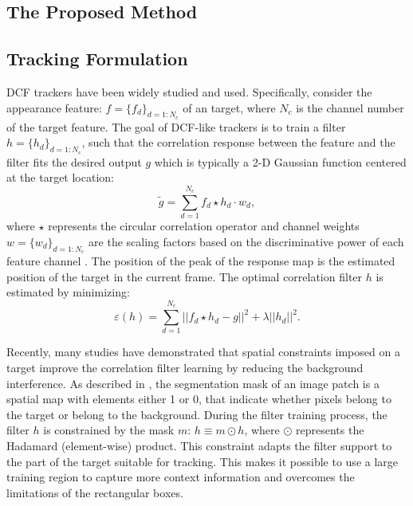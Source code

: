\documentclass[review]{elsarticle}
\begin{document}
\begin{CJK*}{UTF8}{gbsn}
\section{The Proposed Method}

\subsection{Tracking Formulation} \label{sec:InstMask}
DCF trackers \cite{Bolme2010VisualOT, Danelljan2014AccurateSE, Henriques2015HighSpeedTW, Li2014ASA} have been widely studied and used. Specifically, consider the appearance feature: $f=\{f_d\}_{d=1:N_c}$ of an target, where $N_c$ is the channel number of the target feature. The goal of DCF-like trackers is to train a filter $h=\{h_d\}_{d=1:N_c}$, such that the correlation response between the feature and the filter fits the desired output $g$ which is typically a 2-D Gaussian function centered at the target location: 
\begin{equation} \label{eq:dcf}
\tilde{g}=\sum_{d=1}^{N_c}f_d \star h_d \cdot w_d,
\end{equation}
where $\star$ represents the circular correlation operator and channel weights $w = \{w_d\}_{d=1:N_c}$ are the scaling factors based on the discriminative power of each feature channel \cite{Lukezic2017DiscriminativeCF}.
The position of the peak of the response map is the estimated position of the target in the current frame.
The optimal correlation filter $h$ is estimated by minimizing:
\begin{equation}
\varepsilon(h) = \sum_{d=1}^{N_c}||f_d \star h_d - g||^2+\lambda||h_d||^2.
\end{equation}

Recently, many studies \cite{Danelljan2015LearningSR, Lukezic2017DiscriminativeCF, Galoogahi2017LearningBC, Xu2018LearningAD, Feng2018LearningSR} have demonstrated that spatial constraints imposed on a target improve the correlation filter learning by reducing the background interference. As described in \cite{Lukezic2017DiscriminativeCF}, the segmentation mask of an image patch is a spatial map with elements either 1 or 0, that indicate whether pixels belong to the target or belong to the background. During the filter training process, the filter $h$ is constrained by the mask $m$: $h \equiv m \odot h$, where $\odot$ represents the Hadamard (element-wise) product. This constraint adapts the filter support to the part of the target suitable for tracking. This makes it possible to use a large training region to capture more context information and overcomes the limitations of the rectangular boxes.


\end{CJK*}
\end{document}
